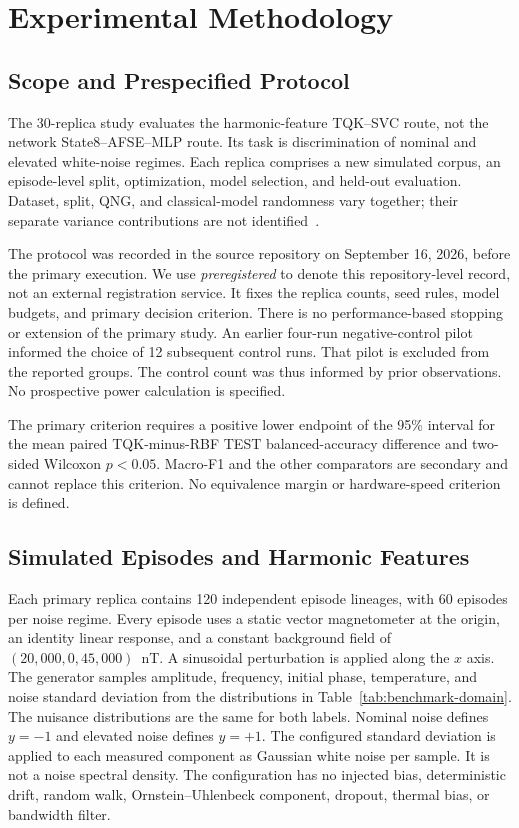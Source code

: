 \section{Experimental Methodology}
\label{sec:methodology}

\subsection{Scope and Prespecified Protocol}
\label{sec:methods-scope}

The 30-replica study evaluates the harmonic-feature TQK--SVC route, not the network State8--AFSE--MLP route. Its task is discrimination of nominal and elevated white-noise regimes. Each replica comprises a new simulated corpus, an episode-level split, optimization, model selection, and held-out evaluation. Dataset, split, QNG, and classical-model randomness vary together; their separate variance contributions are not identified~\cite{aqse2026canonical}.

The protocol was recorded in the source repository on September 16, 2026, before the primary execution. We use \emph{preregistered} to denote this repository-level record, not an external registration service. It fixes the replica counts, seed rules, model budgets, and primary decision criterion. There is no performance-based stopping or extension of the primary study. An earlier four-run negative-control pilot informed the choice of 12 subsequent control runs. That pilot is excluded from the reported groups. The control count was thus informed by prior observations. No prospective power calculation is specified.

The primary criterion requires a positive lower endpoint of the 95\% interval for the mean paired TQK-minus-RBF TEST balanced-accuracy difference and two-sided Wilcoxon $p<0.05$. Macro-F1 and the other comparators are secondary and cannot replace this criterion. No equivalence margin or hardware-speed criterion is defined.

\subsection{Simulated Episodes and Harmonic Features}
\label{sec:methods-data}

Each primary replica contains 120 independent episode lineages, with 60 episodes per noise regime. Every episode uses a static vector magnetometer at the origin, an identity linear response, and a constant background field of $(20{,}000,0,45{,}000)$~nT. A sinusoidal perturbation is applied along the $x$ axis. The generator samples amplitude, frequency, initial phase, temperature, and noise standard deviation from the distributions in Table~\ref{tab:benchmark-domain}. The nuisance distributions are the same for both labels. Nominal noise defines $y=-1$ and elevated noise defines $y=+1$. The configured standard deviation is applied to each measured component as Gaussian white noise per sample. It is not a noise spectral density. The configuration has no injected bias, deterministic drift, random walk, Ornstein--Uhlenbeck component, dropout, thermal bias, or bandwidth filter.

